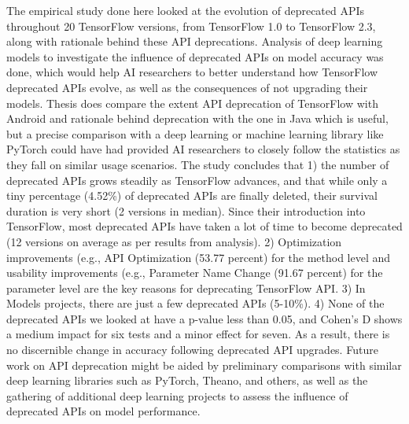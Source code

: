 \documentclass[12pt,letterpaper]{report}
\begin{document}
    The empirical study done here looked at the evolution of deprecated APIs throughout 20 TensorFlow versions, from TensorFlow 1.0 to TensorFlow 2.3, along with rationale behind these API deprecations. Analysis of deep learning models to investigate the influence of deprecated APIs on model accuracy was done, which would help AI researchers to better understand how TensorFlow deprecated APIs evolve, as well as the consequences of not upgrading their models. Thesis does compare the extent API deprecation of TensorFlow with Android and rationale behind deprecation with the one in Java which is useful, but a precise comparison with a deep learning or machine learning library like PyTorch could have had provided AI researchers to closely follow the statistics as they fall on similar usage scenarios. The study concludes that 1) the number of deprecated APIs grows steadily as TensorFlow advances, and that while only a tiny percentage (4.52\%) of deprecated APIs are finally deleted, their survival duration is very short (2 versions in median). Since their introduction into TensorFlow, most deprecated APIs have taken a lot of time to become deprecated (12 versions on average as per results from analysis). 2) Optimization improvements (e.g., API Optimization (53.77 percent) for the method level and usability improvements (e.g., Parameter Name Change (91.67 percent) for the parameter level are the key reasons for deprecating TensorFlow API. 3) In Models projects, there are just a few deprecated APIs (5-10\%). 4) None of the deprecated APIs we looked at have a p-value less than 0.05, and Cohen's D shows a medium impact for six tests and a minor effect for seven. As a result, there is no discernible change in accuracy following deprecated API upgrades. Future work on API deprecation might be aided by preliminary comparisons with similar deep learning libraries such as PyTorch, Theano, and others, as well as the gathering of additional deep learning projects to assess the influence of deprecated APIs on model performance.
\end{document}
